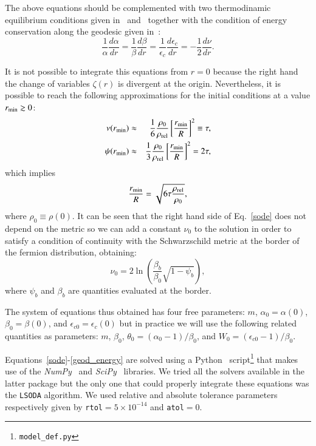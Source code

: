 \documentclass[twocolumn]{aa}
\begin{document}
The above equations should be complemented with two thermodinamic equilibrium conditions given
in~\citet{PhysRev.35.904} and~\citet{RevModPhys.21.531} together with the condition of energy conservation
along the geodesic given in~\citet{1989A&A...221....4M}:
\begin{equation}
   \frac{1}{\alpha}\frac{d\alpha}{dr}=\frac{1}{\beta}\frac{d\beta}{dr}=
   \frac{1}{\epsilon_c}\frac{d\epsilon_c}{dr}=-\frac{1}{2}\frac{d\nu}{dr}.
   \label{geod_energy}
\end{equation}

It is not possible to integrate this equations from $r=0$ because the right hand the change of variables $\zeta(r)$ is divergent at the origin. Nevertheless, it is possible
to reach the following approximations for the initial conditions at a value $r_{\rm{min}}\gtrsim 0$:
\begin{eqnarray}
   \nu(r_{\rm{min}}) &\approx& \frac{1}{6}\frac{\rho_0}{\rho_{\rm{rel}}}\left[\frac{r_{\rm{min}}}{R}\right]^2\equiv\tau, \\
   \psi(r_{\rm{min}})&\approx&\frac{1}{3}\frac{\rho_0}{\rho_{\rm{rel}}}\left[\frac{r_{\rm{min}}}{R}\right]^2=2\tau,
\end{eqnarray}
which implies
\begin{equation}
   \frac{r_{\rm{min}}}{R}=\sqrt{6\tau\frac{\rho_{\rm{rel}}}{\rho_0}},
\end{equation}
where $\rho_0\equiv \rho(0)$.
It can be seen that the right hand side of Eq.~\ref{sode} does not depend on the metric so we can add
a constant $\nu_0$ to the solution in order to satisfy a condition of continuity with the Schwarzschild metric at the border of the fermion distribution, obtaining:
$$\nu_0 = 2\ln\left(\frac{\beta_b}{\beta_0}\sqrt{1-\psi_b}\right),$$
where $\psi_b$ and $\beta_b$ are quantities evaluated at the border.

The system of equations thus obtained has four free parameters: $m$, $\alpha_0=\alpha(0)$,
$\beta_0=\beta(0)$, and $\epsilon_{c0}=\epsilon_c(0)$ but in practice we will use the following related
quantities as parameters:
$m$, $\beta_0$, $\theta_0=(\alpha_0-1)/\beta_0$, and $W_0=(\epsilon_{c0}-1)/\beta_0$.

Equations~\ref{sode}-\ref{geod_energy} are solved using
a {\sc Python}~\citep{van1995python} script\footnote{\texttt{model\_def.py}}
that makes use of the {\it NumPy}~\citep{2020SciPy-NMeth} and {\it SciPy}~\citep{harris2020array} libraries. We tried all the solvers available in the latter package but the only one that
could properly integrate these equations was the \texttt{LSODA} algorithm. We used relative and absolute tolerance parameters respectively given by \texttt{rtol}$=5\times10^{-14}$ and \texttt{atol}$=0$.
\end{document}
